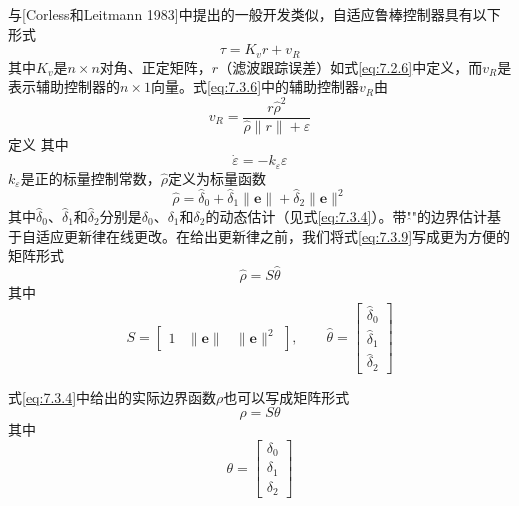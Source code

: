\documentclass[UTF8]{ctexart}
\begin{document}
与[Corless和Leitmann 1983]中提出的一般开发类似，自适应鲁棒控制器具有以下形式
\begin{equation}\label{eq:7.3.6}
\tau = K_v r + v_R
\end{equation}
其中$K_v$是$n \times n$对角、正定矩阵，$r$（滤波跟踪误差）如式\eqref{eq:7.2.6}中定义，而$v_R$是表示辅助控制器的$n \times 1$向量。式\eqref{eq:7.3.6}中的辅助控制器$v_R$由
\begin{equation}\label{eq:7.3.7}
v_R = \frac{r\hat{\rho}^2}{\hat{\rho}\|r\| + \varepsilon}
\end{equation}
定义
其中
\begin{equation}\label{eq:7.3.8}
\dot{\varepsilon} = -k_\varepsilon\varepsilon
\end{equation}
$k_\varepsilon$是正的标量控制常数，$\hat{\rho}$定义为标量函数
\begin{equation}\label{eq:7.3.9}
\hat{\rho} = \hat{\delta}_0 + \hat{\delta}_1\|\mathbf{e}\| + \hat{\delta}_2\|\mathbf{e}\|^2
\end{equation}
其中$\hat{\delta}_0$、$\hat{\delta}_1$和$\hat{\delta}_2$分别是$\delta_0$、$\delta_1$和$\delta_2$的动态估计（见式\eqref{eq:7.3.4}）。带"$\hat{}$"的边界估计基于自适应更新律在线更改。在给出更新律之前，我们将式\eqref{eq:7.3.9}写成更为方便的矩阵形式
\begin{equation}\label{eq:7.3.10}
\hat{\rho} = S\hat{\theta}
\end{equation}
其中
\begin{equation*}
S = \begin{bmatrix} 1 & \|\mathbf{e}\| & \|\mathbf{e}\|^2 \end{bmatrix}, \qquad
\hat{\theta} = \begin{bmatrix} \hat{\delta}_0 \\ \hat{\delta}_1 \\ \hat{\delta}_2 \end{bmatrix}
\end{equation*}

式\eqref{eq:7.3.4}中给出的实际边界函数$\rho$也可以写成矩阵形式
\begin{equation}\label{eq:7.3.11}
\rho = S\theta
\end{equation}
其中
\begin{equation*}
\theta = \begin{bmatrix} \delta_0 \\ \delta_1 \\ \delta_2 \end{bmatrix}
\end{equation*}
\end{document}
